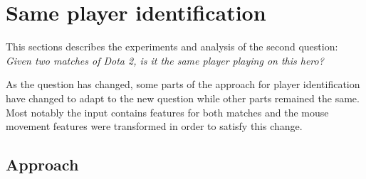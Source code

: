 \documentclass[Report.tex]{subfiles}
\begin{document}
\newcommand{\plotbar}[5]{
\addplot+[
	discard if not={numSplits}{#1},
	discard if not={split}{#2},
	discard if not={features}{#3},
] table [x=model, y=#4,col sep=comma] {data/15-pair-cv.csv};
\addlegendentry{#5}
}

\section{Same player identification}\label{sec:pair-classification}
This sections describes the experiments and analysis of the second question: \textit{Given two matches of Dota 2, is it the same player playing on this hero?}

As the question has changed, some parts of the approach for player identification have changed to adapt to the new question while other parts remained the same. Most notably the input contains features for both matches and the mouse movement features were transformed in order to satisfy this change. 

\subsection{Approach}
\end{document}
